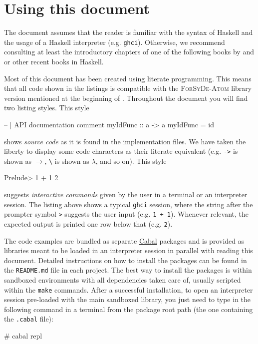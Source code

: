 \section{Using this document}
\label{sec:using-this-document}


\begin{mdframed}[style=attention,frametitle=Disclaimer]
The document assumes that the reader is familiar with the syntax of Haskell and the usage of a Haskell interpreter (e.g. \texttt{ghci}). Otherwise, we recommend consulting at least the introductory chapters of one of the following books by \cite{Lipovaca11} and \cite{Hutton16} or other recent books in Haskell.
\end{mdframed}

Most of this document has been created using literate programming. This means that all code shown in the listings is compatible with the \textsc{ForSyDe-Atom} library version mentioned at the beginning of  \SelfRef. Throughout the document you will find two listing styles. This style
\begin{code}
-- | API documentation comment 
myIdFunc :: a -> a
myIdFunc = id
\end{code}
shows \emph{source code} as it is found in the implementation files. We have taken the liberty to display some code characters as their literate equivalent (e.g. \texttt{->} is shown as $\rightarrow$, \texttt{\textbackslash} is shown as $\lambda$, and so on). \DivergeDoc{}{
 
} This style
\begin{interactive}
Prelude> 1 + 1
2
\end{interactive}
suggests \emph{interactive commands} given by the user in a terminal or an interpreter session. The listing above shows a typical \texttt{ghci} session, where the string after the prompter symbol \texttt{>} suggests the user input (e.g. \texttt{1 + 1}). Whenever relevant, the expected output is printed one row below that (e.g. \texttt{2}).

The code examples are bundled as separate \href{https://www.haskell.org/cabal/}{Cabal} packages and is provided as libraries meant to be loaded in an interpreter session in parallel with reading this document. Detailed instructions on how to install the packages can be found in the \texttt{README.md} file in each project. The best way to install the packages is within sandboxed environments with all dependencies taken care of, usually scripted within the \texttt{make} commands. After a successful installation, to open an interpreter session pre-loaded with the main sandboxed library, you just need to type in the following command in a terminal from the package root path (the one containing the \texttt{.cabal} file):
\begin{interactive}
# cabal repl
\end{interactive}

